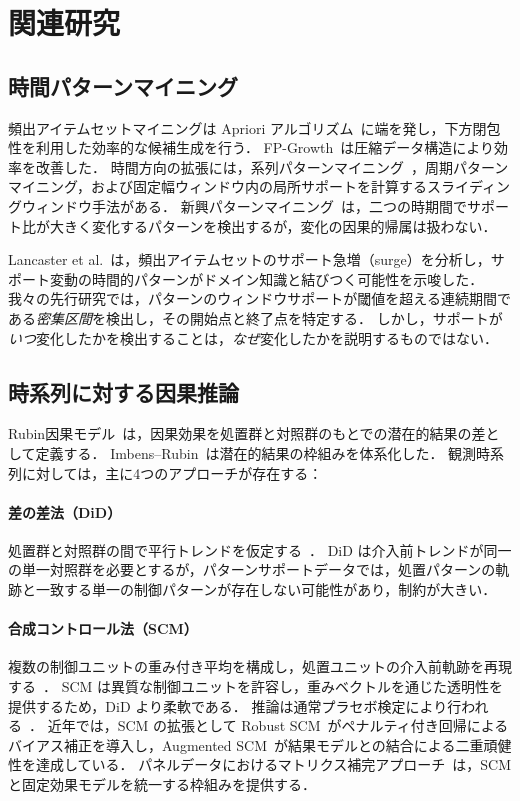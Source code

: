 \section{関連研究}
\label{sec:related}

\subsection{時間パターンマイニング}

頻出アイテムセットマイニングは Apriori アルゴリズム~\cite{agrawal1994fast}に端を発し，下方閉包性を利用した効率的な候補生成を行う．
FP-Growth~\cite{han2000mining}は圧縮データ構造により効率を改善した．
時間方向の拡張には，系列パターンマイニング~\cite{agrawal1995mining}，周期パターンマイニング，および固定幅ウィンドウ内の局所サポートを計算するスライディングウィンドウ手法がある．
新興パターンマイニング~\cite{dong1999emerging}は，二つの時期間でサポート比が大きく変化するパターンを検出するが，変化の因果的帰属は扱わない．

Lancaster et al.~\cite{lancaster2018surges}は，頻出アイテムセットのサポート急増（surge）を分析し，サポート変動の時間的パターンがドメイン知識と結びつく可能性を示唆した．
我々の先行研究では，パターンのウィンドウサポートが閾値を超える連続期間である\emph{密集区間}を検出し，その開始点と終了点を特定する．
しかし，サポートが\emph{いつ}変化したかを検出することは，\emph{なぜ}変化したかを説明するものではない．

\subsection{時系列に対する因果推論}

Rubin因果モデル~\cite{rubin1974estimating}は，因果効果を処置群と対照群のもとでの潜在的結果の差として定義する．
Imbens--Rubin~\cite{imbens2015causal}は潜在的結果の枠組みを体系化した．
観測時系列に対しては，主に4つのアプローチが存在する：

\paragraph{差の差法（DiD）} 処置群と対照群の間で平行トレンドを仮定する~\cite{card1994minimum, angrist2009mostly}．
DiD は介入前トレンドが同一の単一対照群を必要とするが，パターンサポートデータでは，処置パターンの軌跡と一致する単一の制御パターンが存在しない可能性があり，制約が大きい．

\paragraph{合成コントロール法（SCM）} 複数の制御ユニットの重み付き平均を構成し，処置ユニットの介入前軌跡を再現する~\cite{abadie2003economic, abadie2010synthetic, abadie2015comparative}．
SCM は異質な制御ユニットを許容し，重みベクトルを通じた透明性を提供するため，DiD より柔軟である．
推論は通常プラセボ検定により行われる~\cite{abadie2010synthetic}．
近年では，SCM の拡張として Robust SCM~\cite{amjad2018robust}がペナルティ付き回帰によるバイアス補正を導入し，Augmented SCM~\cite{benmichael2021augmented}が結果モデルとの結合による二重頑健性を達成している．
パネルデータにおけるマトリクス補完アプローチ~\cite{athey2021matrix}は，SCM と固定効果モデルを統一する枠組みを提供する．

